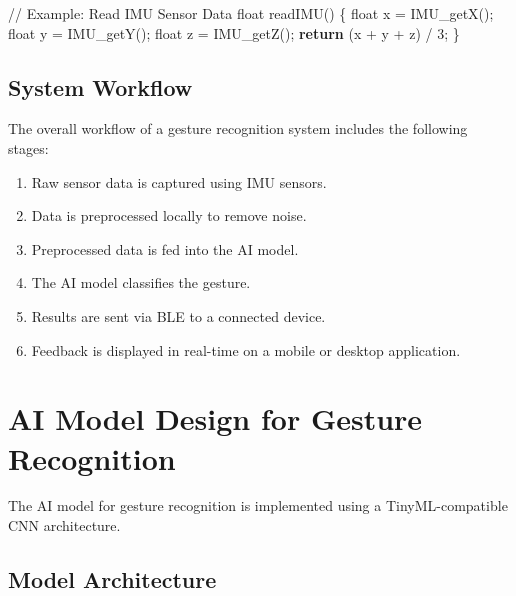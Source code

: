 \documentclass[
  9pt,
  letterpaper,
  abstract,
  titlepage]{scrbook}
\newenvironment{Shaded}{\begin{snugshade}}{\end{snugshade}}
\newcommand{\CommentTok}[1]{\textcolor[rgb]{0.37,0.37,0.37}{#1}}
\newcommand{\ControlFlowTok}[1]{\textcolor[rgb]{0.00,0.23,0.31}{\textbf{#1}}}
\newcommand{\DataTypeTok}[1]{\textcolor[rgb]{0.68,0.00,0.00}{#1}}
\newcommand{\DecValTok}[1]{\textcolor[rgb]{0.68,0.00,0.00}{#1}}
\newcommand{\NormalTok}[1]{\textcolor[rgb]{0.00,0.23,0.31}{#1}}
\newcommand{\OperatorTok}[1]{\textcolor[rgb]{0.37,0.37,0.37}{#1}}
\begin{document}
\begin{Shaded}
\begin{Highlighting}[]
\CommentTok{// Example: Read IMU Sensor Data}
\DataTypeTok{float}\NormalTok{ readIMU}\OperatorTok{()} \OperatorTok{\{}
    \DataTypeTok{float}\NormalTok{ x }\OperatorTok{=}\NormalTok{ IMU\_getX}\OperatorTok{();}
    \DataTypeTok{float}\NormalTok{ y }\OperatorTok{=}\NormalTok{ IMU\_getY}\OperatorTok{();}
    \DataTypeTok{float}\NormalTok{ z }\OperatorTok{=}\NormalTok{ IMU\_getZ}\OperatorTok{();}
    \ControlFlowTok{return} \OperatorTok{(}\NormalTok{x }\OperatorTok{+}\NormalTok{ y }\OperatorTok{+}\NormalTok{ z}\OperatorTok{)} \OperatorTok{/} \DecValTok{3}\OperatorTok{;}
\OperatorTok{\}}
\end{Highlighting}
\end{Shaded}

\subsection{System Workflow}\label{system-workflow}

The overall workflow of a gesture recognition system includes the
following stages:

\begin{enumerate}
\def\labelenumi{\arabic{enumi}.}
\item
  Raw sensor data is captured using IMU sensors.
\item
  Data is preprocessed locally to remove noise.
\item
  Preprocessed data is fed into the AI model.
\item
  The AI model classifies the gesture.
\item
  Results are sent via BLE to a connected device.
\item
  Feedback is displayed in real-time on a mobile or desktop application.
\end{enumerate}

\section{AI Model Design for Gesture
Recognition}\label{ai-model-design-for-gesture-recognition}

The AI model for gesture recognition is implemented using a
TinyML-compatible CNN architecture.

\subsection{Model Architecture}\label{model-architecture}
\end{document}
